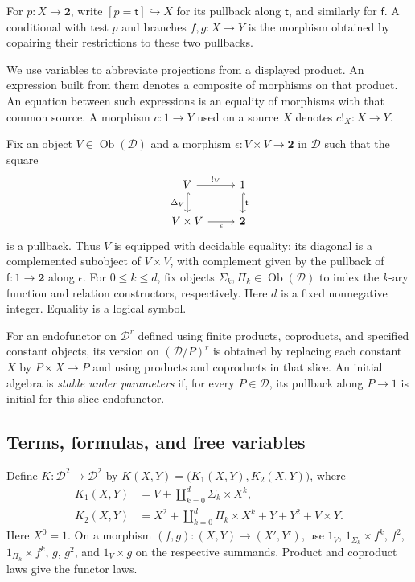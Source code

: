 \documentclass[11pt]{article}
\theoremstyle{definition}\newtheorem{definition}[theorem]{Definition}
\newcommand{\Two}{\mathbf 2}
\begin{document}
For $p:X\to\Two$,
write $[p=\mathsf t]\hookrightarrow X$ for its pullback along
$\mathsf t$, and similarly for $\mathsf f$.
A conditional with test $p$ and branches $f,g:X\to Y$ is the
morphism obtained by copairing their restrictions to these two
pullbacks.

We use variables to abbreviate projections from a displayed product.
An expression built from them denotes a composite of morphisms on
that product. An equation between such expressions is an equality
of morphisms with that common source. A morphism $c:1\to Y$ used
on a source $X$ denotes $c!_X:X\to Y$.

Fix an object $V\in\operatorname{Ob}(\mathcal D)$ and a morphism
$\epsilon:V\times V\to\Two$ in $\mathcal D$ such that the square
\[
\begin{tikzcd}
 V\arrow[r,"{!_V}"]\arrow[d,hook,"\Delta_V"'] &
 1\arrow[d,hook,"\mathsf t"]\\
 V\times V\arrow[r,"\epsilon"'] & \Two
\end{tikzcd}
\]
is a pullback. Thus $V$ is equipped with decidable equality:
its diagonal is a complemented subobject of $V\times V$, with
complement given by the pullback of $\mathsf f:1\to\Two$
along $\epsilon$.
For $0\leq k\leq d$, fix objects
$\Sigma_k,\Pi_k\in\operatorname{Ob}(\mathcal D)$ to index the
$k$-ary function and relation constructors, respectively.
Here $d$ is a fixed nonnegative integer. Equality is a logical symbol.

For an endofunctor on $\mathcal D^r$ defined using finite products,
coproducts, and specified constant objects, its version on
$(\mathcal D/P)^r$ is obtained
by replacing each constant $X$ by $P\times X\to P$ and using
products and coproducts in that slice. An initial algebra is
\emph{stable under parameters} if, for every $P\in\mathcal D$,
its pullback along $P\to1$ is initial for this slice endofunctor.

\subsection{Terms, formulas, and free variables}
\label{app:first-order-syntax}

Define $K:\mathcal D^2\to\mathcal D^2$ by
$K(X,Y)=\bigl(K_1(X,Y),K_2(X,Y)\bigr)$, where
\begin{align}
 K_1(X,Y)&=V+\coprod_{k=0}^{d}\Sigma_k\times X^k,
                                                        \label{eq:term-functor}\\
 K_2(X,Y)&=X^2+\coprod_{k=0}^{d}\Pi_k\times X^k
                  +Y+Y^2+V\times Y.                    \label{eq:formula-functor}
\end{align}
Here $X^0=1$. On a morphism $(f,g):(X,Y)\to(X',Y')$, use
$1_V$, $1_{\Sigma_k}\times f^k$, $f^2$,
$1_{\Pi_k}\times f^k$, $g$, $g^2$, and $1_V\times g$ on
the respective summands. Product and coproduct laws give the
functor laws.
\end{document}
